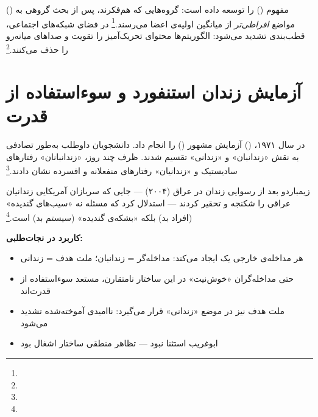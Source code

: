  () مفهوم  () را توسعه داده است: گروه‌هایی که هم‌فکرند، پس از بحث گروهی به مواضع \textit{افراطی‌تر} از میانگین اولیه‌ی اعضا می‌رسند.\footnote{} در فضای شبکه‌های اجتماعی، قطب‌بندی تشدید می‌شود: الگوریتم‌ها محتوای تحریک‌آمیز را تقویت و صداهای میانه‌رو را حذف می‌کنند.\footnote{}


\section{آزمایش زندان استنفورد و سوءاستفاده از قدرت}
\label{sec:ch11-stanford}

در سال ۱۹۷۱،  () آزمایش مشهور  () را انجام داد. دانشجویان داوطلب به‌طور تصادفی به نقش «زندانبان» و «زندانی» تقسیم شدند. ظرف چند روز، «زندانبانان» رفتارهای سادیستیک و «زندانیان» رفتارهای منفعلانه و افسرده نشان دادند.\footnote{}

\begin{tcolorbox}[wavebox, title={درس زیمباردو برای مداخلات خارجی}]
زیمباردو بعد از رسوایی زندان  در عراق (۲۰۰۴) — جایی که سربازان آمریکایی زندانیان عراقی را شکنجه و تحقیر کردند — استدلال کرد که مسئله نه «سیب‌های گندیده» (افراد بد) بلکه «بشکه‌ی گندیده» (سیستم بد) است.\footnote{}

\textbf{کاربرد در نجات‌طلبی:}
\begin{itemize}
\item هر مداخله‌ی خارجی یک  ایجاد می‌کند: مداخله‌گر = زندانبان؛ ملت هدف = زندانی
\item حتی مداخله‌گران «خوش‌نیت» در این ساختار نامتقارن، مستعد سوءاستفاده از قدرت‌اند
\item ملت هدف نیز در موضع «زندانی» قرار می‌گیرد: ناامیدی آموخته‌شده تشدید می‌شود
\item ابوغریب استثنا نبود — تظاهر منطقی ساختار اشغال بود
\end{itemize}
\end{tcolorbox}


